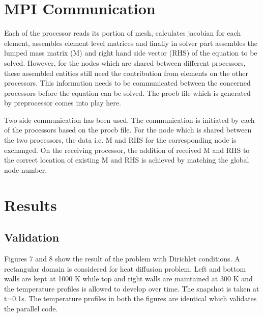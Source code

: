 \documentclass[a4paper, 11pt, oneside]{scrartcl}
\begin{document}
\section{MPI Communication}
Each of the processor reads its portion of mesh, calculates jacobian for each element, assembles element level matrices and finally in solver part assembles the lumped mass matrix (M) and right hand side vector (RHS) of the equation to be solved. However, for the nodes which are shared between different processors, these assembled entities still need the contribution from elements on the other processors. This information needs to be communicated between the concerned processors before the equation can be solved. The procb file which is generated by preprocessor comes into play here. 

Two side communication has been used. The communication is initiated by each of the processors based on the procb file. For the node which is shared between the two processors, the data i.e. M and RHS for the corresponding node is exchanged. On the receiving processor, the addition of received M and RHS to the correct location of existing M and RHS is achieved by matching the global node number.

\section{Results}
\subsection{Validation}
Figures 7 and 8 show the result of the problem with Dirichlet conditions. A rectangular domain is considered for heat diffusion problem. Left and bottom walls are kept at 1000 K while top and right walls are maintained at 300 K and the temperature profiles is allowed to develop over time. The snapshot is taken at t=0.1s. The temperature profiles in both the figures are identical which validates the parallel code.
\end{document}
